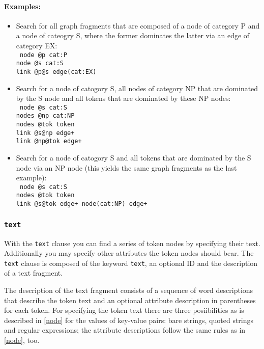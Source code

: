 \documentclass[12pt]{scrartcl}
\begin{document}
\paragraph*{Examples:}
\begin{itemize}
	\item Search for all graph fragments that are composed of a node of category P and a node of cateogry S, where the former dominates the latter via an edge of category EX:\\
	{\tt
	node @p cat:P\\[-.4ex]
	node @s cat:S\\[-.4ex]
	link @p@s edge(cat:EX)
	}
	\item Search for a node of catogory S, all nodes of category NP that are dominated by the S node and all tokens that are dominated by these NP nodes:\\
	{\tt
	node @s cat:S\\[-.4ex]
	nodes @np cat:NP\\[-.4ex]
	nodes @tok token\\[-.4ex]
	link @s@np edge+\\[-.4ex]
	link @np@tok edge+
	}
	\item Search for a node of catogory S and all tokens that are dominated by the S node via an NP node (this yields the same graph fragments as the last example):\\
	{\tt
	node @s cat:S\\[-.4ex]
	nodes @tok token\\[-.4ex]
	link @s@tok edge+ node(cat:NP) edge+
	}
\end{itemize}



\subsubsection{\texttt{text}}

With the \texttt{text} clause you can find a series of token nodes by specifying their text.
Additionally you may specify other attributes the token nodes should bear.
The \texttt{text} clause is composed of the keyword \texttt{text}, an optional ID and the description of a text fragment.

The description of the text fragment consists of a sequence of word descriptions that describe the token text and an optional attribute description in parentheses for each token.
For specifying the token text there are three posiibilities as is described in \ref{node} for the values of key-value pairs: bare strings, quoted strings and regular expressions; the attribute descriptions follow the same rules as in \ref{node}, too.
\end{document}
